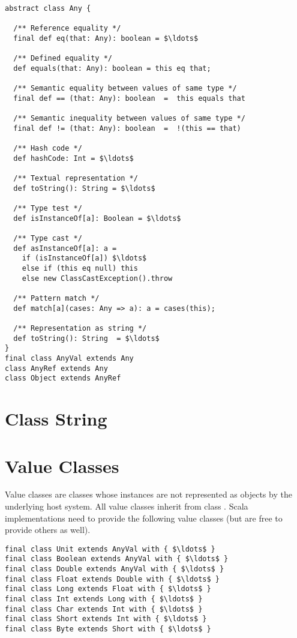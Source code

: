 \documentclass[a4paper,12pt,twoside,titlepage]{book}
\begin{document}
\begin{lstlisting}
abstract class Any {

  /** Reference equality */
  final def eq(that: Any): boolean = $\ldots$

  /** Defined equality */
  def equals(that: Any): boolean = this eq that;

  /** Semantic equality between values of same type */
  final def == (that: Any): boolean  =  this equals that

  /** Semantic inequality between values of same type */
  final def != (that: Any): boolean  =  !(this == that)

  /** Hash code */
  def hashCode: Int = $\ldots$

  /** Textual representation */
  def toString(): String = $\ldots$

  /** Type test */
  def isInstanceOf[a]: Boolean = $\ldots$

  /** Type cast */
  def asInstanceOf[a]: a = 
    if (isInstanceOf[a]) $\ldots$ 
    else if (this eq null) this
    else new ClassCastException().throw

  /** Pattern match */
  def match[a](cases: Any => a): a = cases(this);

  /** Representation as string */
  def toString(): String  = $\ldots$
}
final class AnyVal extends Any
class AnyRef extends Any
class Object extends AnyRef
\end{lstlisting}

\section{Class String}



\section{Value Classes}
\label{sec:cls-value}

Value classes are classes whose instances are not represented as
objects by the underlying host system.  All value classes inherit from
class . Scala implementations need to provide the
following value classes (but are free to provide others as well).

\begin{lstlisting}
final class Unit extends AnyVal with { $\ldots$ }
final class Boolean extends AnyVal with { $\ldots$ }
final class Double extends AnyVal with { $\ldots$ }
final class Float extends Double with { $\ldots$ }
final class Long extends Float with { $\ldots$ }
final class Int extends Long with { $\ldots$ }
final class Char extends Int with { $\ldots$ }
final class Short extends Int with { $\ldots$ }
final class Byte extends Short with { $\ldots$ }
\end{lstlisting}
\end{document}
